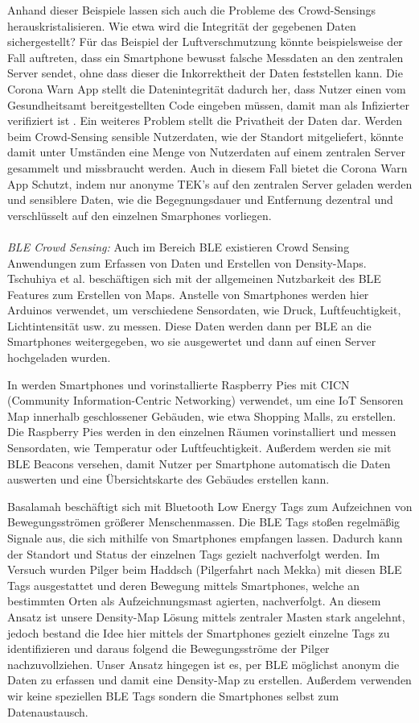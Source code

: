 \documentclass[conference]{IEEEtran}
\begin{document}
Anhand dieser Beispiele lassen sich auch die Probleme des Crowd-Sensings herauskristalisieren. Wie etwa wird die Integrität der gegebenen Daten sichergestellt?
Für das Beispiel der Luftverschmutzung könnte beispielsweise der Fall auftreten, dass ein Smartphone bewusst falsche Messdaten an den zentralen Server sendet, ohne dass dieser die Inkorrektheit der Daten feststellen kann.
Die Corona Warn App stellt die Datenintegrität dadurch her, dass Nutzer einen vom Gesundheitsamt bereitgestellten Code eingeben müssen, damit man als Infizierter verifiziert ist \cite{CWA}.
Ein weiteres Problem stellt die Privatheit der Daten dar. Werden beim Crowd-Sensing sensible Nutzerdaten, wie der Standort mitgeliefert, könnte damit unter Umständen eine Menge von Nutzerdaten auf einem zentralen Server gesammelt und missbraucht werden.
Auch in diesem Fall bietet die Corona Warn App Schutzt, indem nur anonyme TEK's auf den zentralen Server geladen werden und sensiblere Daten, wie die Begegnungsdauer und Entfernung dezentral und verschlüsselt auf den einzelnen Smarphones vorliegen.\\
\\
\textit{BLE Crowd Sensing:}
Auch im Bereich BLE existieren Crowd Sensing Anwendungen zum Erfassen von Daten und Erstellen von Density-Maps. 
Tschuhiya et al. \cite{BLESensorDevices} beschäftigen sich mit der allgemeinen Nutzbarkeit des BLE Features zum Erstellen von Maps. 
Anstelle von Smartphones werden hier Arduinos verwendet, um verschiedene Sensordaten, wie Druck, Luftfeuchtigkeit, Lichtintensität usw. zu messen. 
Diese Daten werden dann per BLE an die Smartphones weitergegeben, wo sie ausgewertet und dann auf einen Server hochgeladen wurden. 

In \cite{CICN} werden Smartphones und vorinstallierte Raspberry Pies mit CICN (Community Information-Centric Networking)  verwendet, um eine IoT Sensoren Map innerhalb geschlossener Gebäuden, wie etwa Shopping Malls, zu erstellen. 
Die Raspberry Pies werden in den einzelnen Räumen vorinstalliert und messen Sensordaten, wie Temperatur oder Luftfeuchtigkeit. 
Außerdem werden sie mit BLE Beacons versehen, damit Nutzer per Smartphone automatisch die Daten auswerten und eine Übersichtskarte des Gebäudes erstellen kann.  

Basalamah \cite{BLETags} beschäftigt sich mit Bluetooth Low Energy Tags zum Aufzeichnen von Bewegungsströmen größerer Menschenmassen. 
Die BLE Tags stoßen regelmäßig Signale aus, die sich mithilfe von Smartphones empfangen lassen. 
Dadurch kann der Standort und Status der einzelnen Tags gezielt nachverfolgt werden. 
Im Versuch wurden Pilger beim Haddsch (Pilgerfahrt nach Mekka) mit diesen BLE Tags ausgestattet und deren Bewegung mittels Smartphones, welche an bestimmten Orten als Aufzeichnungsmast agierten, nachverfolgt. 
An diesem Ansatz ist unsere Density-Map Lösung mittels zentraler Masten stark angelehnt, jedoch bestand die Idee hier mittels der Smartphones gezielt einzelne Tags zu identifizieren und daraus folgend die Bewegungsströme der Pilger nachzuvollziehen. 
Unser Ansatz hingegen ist es, per BLE möglichst anonym die Daten zu erfassen und damit eine Density-Map zu erstellen. 
Außerdem verwenden wir keine speziellen BLE Tags sondern die Smartphones selbst zum Datenaustausch. 
\end{document}

